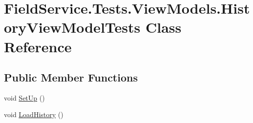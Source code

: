 \hypertarget{class_field_service_1_1_tests_1_1_view_models_1_1_history_view_model_tests}{\section{Field\+Service.\+Tests.\+View\+Models.\+History\+View\+Model\+Tests Class Reference}
\label{class_field_service_1_1_tests_1_1_view_models_1_1_history_view_model_tests}
}
\subsection*{Public Member Functions}
\begin{DoxyCompactItemize}
\item 
void \hyperlink{class_field_service_1_1_tests_1_1_view_models_1_1_history_view_model_tests_a566f6c1efecae4a483bd6a1bc40850fb}{Set\+Up} ()
\item 
void \hyperlink{class_field_service_1_1_tests_1_1_view_models_1_1_history_view_model_tests_a7fc961e7e30d0b85e939666d4c43f994}{Load\+History} ()
\end{DoxyCompactItemize}


